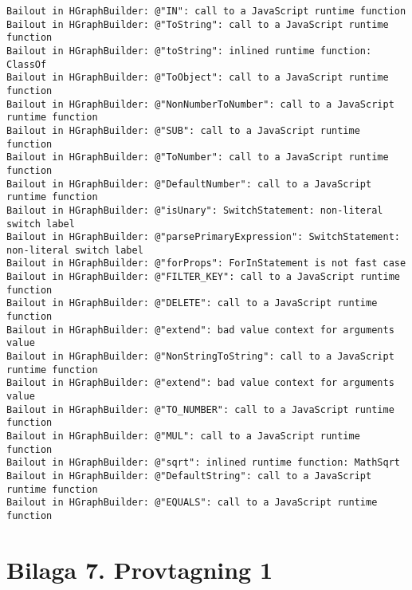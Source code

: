 \footnotesize
\begin{verbatim}
Bailout in HGraphBuilder: @"IN": call to a JavaScript runtime function
Bailout in HGraphBuilder: @"ToString": call to a JavaScript runtime function
Bailout in HGraphBuilder: @"toString": inlined runtime function: ClassOf
Bailout in HGraphBuilder: @"ToObject": call to a JavaScript runtime function
Bailout in HGraphBuilder: @"NonNumberToNumber": call to a JavaScript runtime function
Bailout in HGraphBuilder: @"SUB": call to a JavaScript runtime function
Bailout in HGraphBuilder: @"ToNumber": call to a JavaScript runtime function
Bailout in HGraphBuilder: @"DefaultNumber": call to a JavaScript runtime function
Bailout in HGraphBuilder: @"isUnary": SwitchStatement: non-literal switch label
Bailout in HGraphBuilder: @"parsePrimaryExpression": SwitchStatement: non-literal switch label
Bailout in HGraphBuilder: @"forProps": ForInStatement is not fast case
Bailout in HGraphBuilder: @"FILTER_KEY": call to a JavaScript runtime function
Bailout in HGraphBuilder: @"DELETE": call to a JavaScript runtime function
Bailout in HGraphBuilder: @"extend": bad value context for arguments value
Bailout in HGraphBuilder: @"NonStringToString": call to a JavaScript runtime function
Bailout in HGraphBuilder: @"extend": bad value context for arguments value
Bailout in HGraphBuilder: @"TO_NUMBER": call to a JavaScript runtime function
Bailout in HGraphBuilder: @"MUL": call to a JavaScript runtime function
Bailout in HGraphBuilder: @"sqrt": inlined runtime function: MathSqrt
Bailout in HGraphBuilder: @"DefaultString": call to a JavaScript runtime function
Bailout in HGraphBuilder: @"EQUALS": call to a JavaScript runtime function
\end{verbatim}

\clearpage
{}
\section*{Bilaga 7. Provtagning 1}

